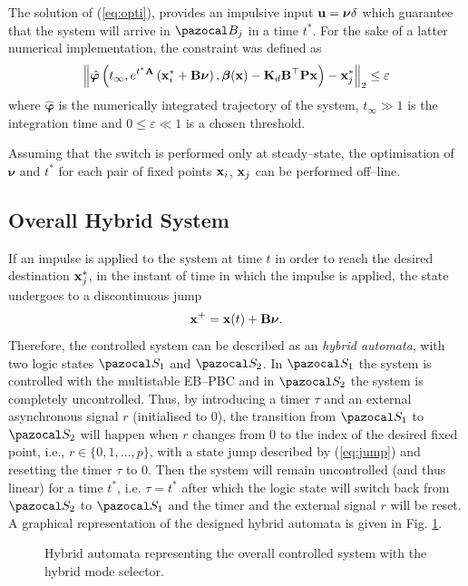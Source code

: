 The solution of (\ref{eq:opti}), provides an impulsive input  $\mathbf{u} = \bm\nu\delta$ which guarantee that the system will arrive in $\B_j$ in a time $t^*$.  
For the sake of a latter numerical implementation, the constraint was defined as
\begin{align}
    \left\|\hat{\bm\varphi}\left(t_{\infty},e^{t^*\mathbf{A}}\left(\mathbf{x}_i^*+\mathbf{B}\bm\nu\right),\bm\beta(\mathbf{x})-\mathbf{K}_d\mathbf{B}^\top \mathbf{P}\mathbf{x}\right)-\mathbf{x}^*_j\right\|_2\leq\varepsilon
\end{align}
%
where $\hat{\bm\varphi}$ is the numerically integrated trajectory of the system, $t_\infty\gg 1$ is the integration time and $0\leq\varepsilon \ll 1$ is a chosen threshold.
%
\begin{rem}
	Assuming that the switch is performed only at steady--state, the optimisation of $\bm\nu$ and $t^*$ for each pair of fixed points $\mathbf{x}_i$, $\mathbf{x}_j$ can be performed off--line.
\end{rem}
%
\subsection{Overall Hybrid System}
%
If an impulse is applied to the system at time $t$  in order to reach the desired destination $\mathbf{x}_j^*$, in the instant of time in which the impulse is applied, the state undergoes to a discontinuous jump
%
\begin{equation}\label{eq:jump}
    \mathbf{x}^+ = \mathbf{x}(t) + \mathbf{B}\bm\nu.
\end{equation}
%
Therefore, the controlled system can be described as an \textit{hybrid automata}, with two logic states $\Sa_1$ and $\Sa_2$. In $\Sa_1$ the system is controlled with the multistable EB--PBC and in $\Sa_2$ the system is completely uncontrolled. Thus, by introducing a timer $\tau$ and an external asynchronous signal $r$ (initialised to $0$), the transition from $\Sa_1$ to $\Sa_2$ will happen when $r$ changes from $0$ to the index of the desired fixed point, i.e., $r\in\{0,1,\dots,p\}$, with a state jump described by (\ref{eq:jump}) and resetting the timer $\tau$ to $0$. Then the system will remain uncontrolled (and thus linear) for a time $t^*$, i.e. $\tau = t^*$ after which the logic state will switch back from $\Sa_2$ to $\Sa_1$  and the timer and the external signal $r$ will be reset. A graphical representation of the designed hybrid automata is given in Fig. \ref{fig:automata}. 
%
\begin{figure}[!ht]
	\centering
	
	\caption{Hybrid automata representing the overall controlled system with the hybrid mode selector.}
	\label{fig:automata}
\end{figure}
%
\clearpage
